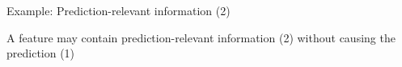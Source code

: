 \documentclass[10pt,compress,t,notes=noshow, xcolor=table]{beamer}
\begin{document}
\begin{frame}{Example: Prediction-relevant information (2)}

  A feature may contain prediction-relevant information (2) without causing the prediction (1)
\begin{columns}[T, totalwidth=\textwidth]
  \begin{column}{0.52\textwidth}
		
		

\end{column}
\end{columns}
\end{frame}
\end{document}

